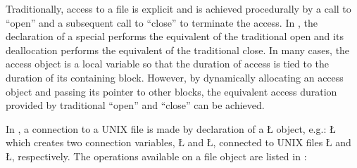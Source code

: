 \documentclass[openright,twoside]{report}
\begin{document}
Traditionally, access to a file is explicit and is achieved procedurally by a call to ``open'' and a subsequent call to ``close'' to terminate the access.
In \uC, the declaration of a special  performs the equivalent of the traditional open and its deallocation performs the equivalent of the traditional close.
In many cases, the access object is a local variable so that the duration of access is tied to the duration of its containing block.
However, by dynamically allocating an access object and passing its pointer to other blocks, the equivalent access duration provided by traditional ``open'' and ``close'' can be achieved.

In \uC, a connection to a UNIX file is made by declaration of a \LGinlinetrue\LGbegin\lgrinde\L{}\endlgrinde\LGend{} object, e.g.:
\LGinlinefalse\LGbegin\lgrinde
\L{}
\endlgrinde\LGend
which creates two connection variables, \LGinlinetrue\LGbegin\lgrinde\L{}\endlgrinde\LGend{} and \LGinlinetrue\LGbegin\lgrinde\L{}\endlgrinde\LGend{}, connected to UNIX files \LGinlinetrue\LGbegin\lgrinde\L{}\endlgrinde\LGend{} and \LGinlinetrue\LGbegin\lgrinde\L{}\endlgrinde\LGend{}, respectively.
The operations available on a file object are listed in :
\end{document}
